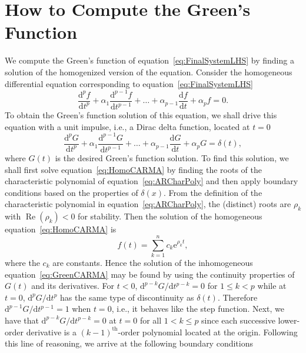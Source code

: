 \documentclass[a4paper,fleqn,usenatbib]{mnras}
\begin{document}
\section[Green's Function Computation]{How to Compute the Green's Function}\label{sec:GFComputation}

We compute the Green's function of equation~\eqref{eq:FinalSystemLHS} by finding a solution of the homogenized version of the equation. Consider the homogeneous differential equation corresponding to equation~\eqref{eq:FinalSystemLHS}
\begin{equation}\label{eq:HomoCARMA}
\frac{\mathrm{d}^{p}f}{\mathrm{d}t^{p}} + \alpha_{1} \frac{\mathrm{d}^{p-1}f}{\mathrm{d}t^{p-1}} + \ldots + \alpha_{p-1} \frac{\mathrm{d}f}{\mathrm{d}t} + \alpha_{p} f = 0.
\end{equation}
To obtain the Green's function solution of this equation, we shall drive this equation with a unit impulse, i.e., a Dirac delta function, located at $t = 0$
\begin{equation}\label{eq:GreenCARMA}
\frac{\mathrm{d}^{p}G}{\mathrm{d}t^{p}} + \alpha_{1} \frac{\mathrm{d}^{p-1}G}{\mathrm{d}t^{p-1}} + \ldots + \alpha_{p-1} \frac{\mathrm{d}G}{\mathrm{d}t} + \alpha_{p} G = \delta(t),
\end{equation}
where $G(t)$ is the desired Green's function solution. To find this solution, we shall first solve equation~\eqref{eq:HomoCARMA} by finding the roots of the characteristic polynomial of equation~\eqref{eq:ARCharPoly} and then apply boundary conditions based on the properties of $\delta(x)$. From the definition of the characteristic polynomial in equation~\eqref{eq:ARCharPoly}, the (distinct) roots are $\rho_{k}$ with $\operatorname{Re}(\rho_{k}) < 0$ for stability. Then the solution of the homogeneous equation~\eqref{eq:HomoCARMA} is 
\begin{equation}\label{eq:HomoSol}
f(t) = \sum_{k = 1}^{n} c_{k} \mathrm{e}^{\rho_{k}t},
\end{equation}
where the $c_{k}$ are constants. Hence the solution of the inhomogeneous equation~\eqref{eq:GreenCARMA} may be found by using the continuity properties of $G(t)$ and its derivatives. For $t < 0$, $\mathrm{d}^{p-k}G/\mathrm{d}t^{p-k} = 0$ for $1 \leq k < p$ while at $t = 0$, $\mathrm{d}^{p}G/\mathrm{d}t^{p}$ has the same type of discontinuity as $\delta(t)$. Therefore $\mathrm{d}^{p-1}G/\mathrm{d}t^{p-1} = 1$ when $t = 0$, i.e., it behaves like the step function. Next, we have that $\mathrm{d}^{p-k}G/\mathrm{d}t^{p-k} = 0$ at $t = 0$ for all $1 < k \leq p$ since each successive lower-order derivative is a $(k-1)^{\mathrm{th}}$-order polynomial located at the origin. Following this line of reasoning, we arrive at the following boundary conditions
\end{document}
